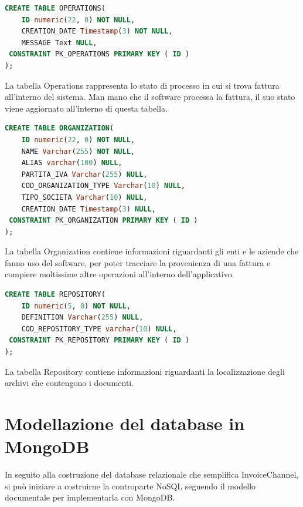 \begin{lstlisting}[language=SQL,
        deletekeywords={IDENTITY,INT},
        morekeywords={clustered},    
        framesep=10pt,
        framextopmargin=10pt, style=sql_style]
CREATE TABLE OPERATIONS(
    ID numeric(22, 0) NOT NULL,
    CREATION_DATE Timestamp(3) NOT NULL,
    MESSAGE Text NULL,
 CONSTRAINT PK_OPERATIONS PRIMARY KEY ( ID )
);
\end{lstlisting}
\noindent La tabella Operations rappresenta lo stato di processo in cui si trova fattura all'interno del sistema. Man mano che il software processa la fattura, il suo stato viene aggiornato all'interno di questa tabella.\\

\begin{lstlisting}[language=SQL,
        deletekeywords={IDENTITY,INT},
        morekeywords={clustered},    
        framesep=10pt,
        framextopmargin=10pt, style=sql_style]
CREATE TABLE ORGANIZATION(
    ID numeric(22, 0) NOT NULL,
    NAME Varchar(255) NOT NULL,
    ALIAS varchar(100) NULL,
    PARTITA_IVA Varchar(255) NULL,
    COD_ORGANIZATION_TYPE Varchar(10) NULL,
    TIPO_SOCIETA Varchar(10) NULL,
    CREATION_DATE Timestamp(3) NULL,
 CONSTRAINT PK_ORGANIZATION PRIMARY KEY ( ID )
);
\end{lstlisting}
\noindent La tabella Organization contiene informazioni riguardanti gli enti e le aziende che fanno uso del software, per poter tracciare la provenienza di una fattura e compiere moltissime altre operazioni all'interno dell'applicativo.\\

\begin{lstlisting}[language=SQL,
        deletekeywords={IDENTITY,INT},
        morekeywords={clustered},    
        framesep=10pt,
        framextopmargin=10pt, style=sql_style]
CREATE TABLE REPOSITORY(
    ID numeric(5, 0) NOT NULL,
    DEFINITION Varchar(255) NULL,
    COD_REPOSITORY_TYPE varchar(10) NULL,
 CONSTRAINT PK_REPOSITORY PRIMARY KEY ( ID )
);
\end{lstlisting}
\noindent La tabella Repository contiene informazioni riguardanti la localizzazione degli archivi che contengono i documenti. \\


\section{Modellazione del database in MongoDB}
In seguito alla costruzione del database relazionale che semplifica InvoiceChannel, si può iniziare a costruirne la controparte NoSQL seguendo il modello documentale per implementarla con MongoDB.\\


